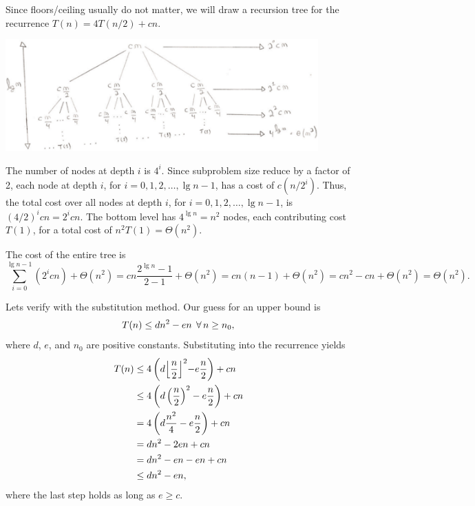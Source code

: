\begin{enumerate}
\begin{framed}
Since floors/ceiling usually do not matter, we will draw a recursion tree for
the recurrence $T(n) = 4T(n/2) + cn$.

\begin{center}
\includegraphics[width=0.9\textwidth]{images/4_4_7_1.pdf}
\end{center}

The number of nodes at depth $i$ is $4^i$. Since subproblem size reduce by
a factor of 2, each node at depth $i$, for $i = 0, 1, 2, \dots, \lg n - 1$,
has a cost of $c (n/2^i)$. Thus, the total cost over all nodes at depth
$i$, for $i = 0, 1, 2, \dots, \lg n - 1$, is $(4/2)^i cn = 2^i cn$. The bottom
level has $4^{\lg n} = n^2$ nodes, each contributing cost $T(1)$, for a total
cost of $n^2 T(1) = \Theta(n^2)$.

The cost of the entire tree is
\[
\sum_{i = 0}^{\lg n - 1} (2^i cn) + \Theta(n^2)
= cn \frac{2^{\lg n} - 1}{2 - 1} + \Theta(n^2)
= cn (n - 1) + \Theta(n^2)
= cn^2 - cn + \Theta(n^2)
= \Theta(n^2).
\]

Lets verify with the substitution method. Our guess for an upper bound is
\[
T(n) \le dn^2 - en \; \operatorname{\forall} n \ge n_0,
\]
where $d$, $e$, and $n_0$ are positive constants. Substituting into the
recurrence yields
\begin{equation*}
\begin{aligned}
  T(n) &\le 4\left(d \Bigl\lfloor\frac{n}{2}\Bigl\rfloor^2 -e \frac{n}{2}\right) + cn\\
       &\le 4\left(d \left(\frac{n}{2}\right)^2 -e \frac{n}{2}\right) + cn\\
       &=   4\left(d \frac{n^2}{4} -e \frac{n}{2}\right) + cn\\
       &=   d n^2 -2en + cn\\
       &=   d n^2 - en - en + cn\\
       &\le   d n^2 - en,
\end{aligned}
\end{equation*}
where the last step holds as long as $e \ge c$.


\end{framed}
\end{enumerate}
